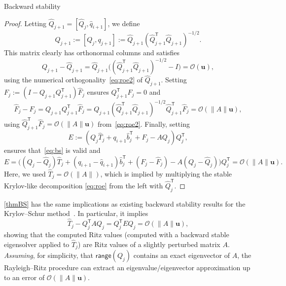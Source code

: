 \documentclass{siamart190516}
\newcommand{\Ttran}{\mathsf{T}}
\newcommand{\defi}{:=}
\newcommand{\order}{\mathcal{O}}
\newcommand{\range}{\mathsf{range}}
\newcommand{\mpr}{\mathbf{u}}
\providecommand{\norm}[1]{\lVert#1\rVert}
\begin{document}
\begin{paragraph}{Backward stability}
\begin{proof}
    Letting $\widehat{Q}_{j+1} = [\widehat{Q}_{j},\widehat{q}_{i+1}]$, we define
    \begin{equation*}
        Q_{j+1} := [Q_{j},q_{j+1}] \defi \widehat{Q}_{j+1}(\widehat{Q}_{j+1}^{\Ttran}\widehat{Q}_{j+1})^{-1/2}.
    \end{equation*}
    This matrix clearly has orthonormal columns and satisfies
    \begin{equation*}
        Q_{j+1}-\widehat{Q}_{j+1}
         = \widehat{Q}_{j+1}\bigl((\widehat{Q}_{j+1}^{\Ttran}\widehat{Q}_{j+1})^{-1/2}-I\bigr) = \order(\mpr), 
    \end{equation*}
    using the numerical orthogonality~\eqref{eq:roe2} of $\widehat{Q}_{j+1}$. Setting
    $
        F_{j} \defi (I-Q_{j+1}Q_{j+1}^{\Ttran})\widehat{F}_{j}
    $
    ensures $Q_{j+1}^{\Ttran}F_{j}=0$ and 
    \begin{equation*}
        \widehat{F}_{j}-F_{j} =  Q_{j+1}Q_{j+1}^{\Ttran}\widehat{F}_{j} = Q_{j+1}(\widehat{Q}_{j+1}^{\Ttran}\widehat{Q}_{j+1})^{-1/2}\widehat{Q}_{j+1}^{\Ttran}\widehat{F}_{j} = \order(\norm{A}\mpr),   
    \end{equation*}
    using $\widehat{Q}_{j+1}^{\Ttran}\widehat{F}_{j}=\order(\norm{A}\mpr)$ from~\eqref{eq:roe2}. Finally, setting
    \begin{equation*}
        E \defi  (Q_{j}\widehat{T}_{j}+q_{i+1}\widehat{b}_{j}^{\Ttran}+F_{j}-AQ_{j})Q_{j}^{\Ttran},
    \end{equation*}
    ensures that~\cref{eq:bs} is valid and
        \begin{equation*}
        E = \bigl((Q_{j}-\widehat{Q}_{j})\widehat{T}_{j}+(q_{i+1}-\widehat{q}_{i+1})\widehat{b}_{j}^{\Ttran}+(F_{j}-\widehat{F}_{j})-A(Q_{j}-\widehat{Q}_{j})\bigr)Q_{j}^{\Ttran} = \order(\norm{A}\mpr).
    \end{equation*}
    Here, we used $\widehat{T}_{j}=\order(\norm{A})$, which is implied by multiplying the stable Krylov-like decomposition \cref{eq:roe} from the left with $\widehat{Q}_{j}^{\Ttran}$.
\end{proof}

\cref{thmBS} has the same implications as existing backward stability results for the Krylov--Schur method~\cite[Chap.~5, Thm.2.5]{Stewart2001}. In particular, it implies
\begin{equation*}
    \widehat{T}_{j}-Q_{j}^{\Ttran}AQ_{j} = Q_{j}^{\Ttran}EQ_{j} = \order(\norm{A}\mpr),
\end{equation*}
showing that the computed Ritz values (computed with a backward stable eigensolver applied to $\widehat{T}_{j}$)
are Ritz values of a slightly perturbed matrix $A$. 
\emph{Assuming}, for simplicity, that $\range(Q_{j})$ contains an exact eigenvector of $A$, the Rayleigh--Ritz procedure can extract an eigenvalue/eigenvector approximation up to an error of $\order(\norm{A}\mpr)$.

\end{paragraph}
\end{document}
